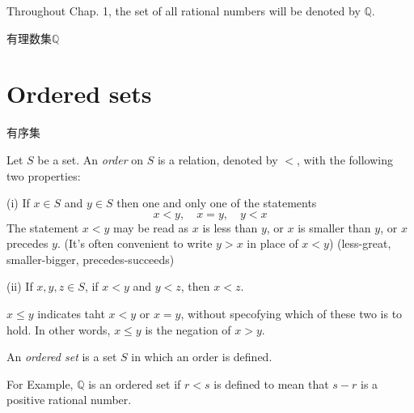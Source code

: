 
\begin{Definition}
Throughout Chap. 1, the set of all rational numbers will be denoted by $\mathbb{Q}$.
\end{Definition}

有理数集$\mathbb{Q}$

\section{Ordered sets}
有序集

\begin{Definition}
Let $S$ be a set. An \emph{order} on $S$ is a relation, denoted by $<$, with the following two properties:

(i) If $x\in S$ and $y\in S$ then one and only one of the statements
\begin{equation*}
    x<y, \quad
    x=y, \quad
    y<x
\end{equation*}
The statement $x<y$ may be read as 
$x$ is less than $y$, or 
$x$ is smaller than $y$, or
$x$ precedes $y$.
(It's often convenient to write $y>x$ in place of $x<y$)
(less-great, smaller-bigger, precedes-succeeds)

(ii) If $x,y,z\in S$, if $x<y$ and $y<z$, then $x<z$.

$x\leq y$ indicates taht $x<y$ or $x=y$, without specofying which of these two is to hold.
In other words, $x\leq y$ is the negation of $x>y$.
\end{Definition}




An \emph{ordered set} is a set $S$ in which an order is defined.

For Example, $\mathbb{Q}$ is an ordered set if $r<s$ is defined to mean that $s-r$ is a positive rational number.


